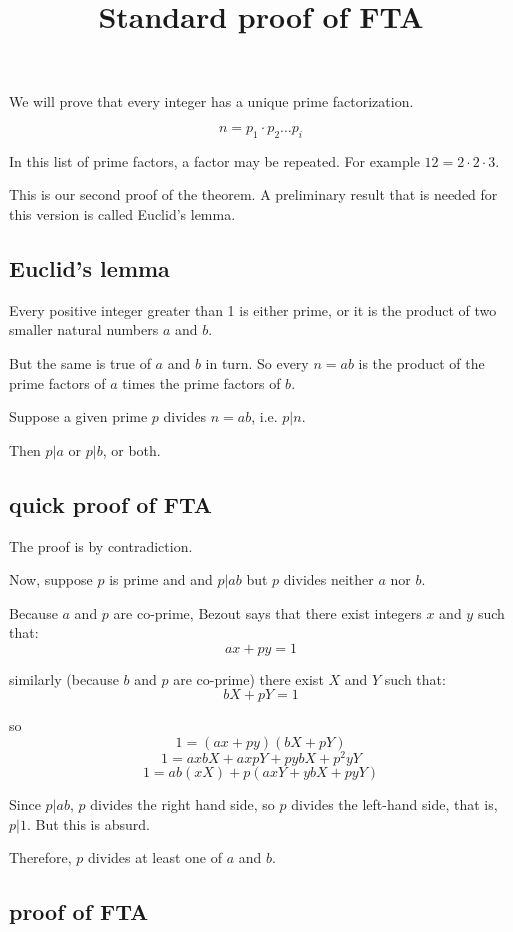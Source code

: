 \documentclass[11pt, oneside]{article}
\title{Standard proof of FTA}
\date{}
\begin{document}
\maketitle
\Large

We will prove that every integer has a unique prime factorization.

\[ n = p_1 \cdot p_2 \dots p_i \]

In this list of prime factors, a factor may be repeated.  For example $12 = 2 \cdot 2 \cdot 3$.

This is our second proof of the theorem.  A preliminary result that is needed for this version is called Euclid's lemma.

\subsection*{Euclid's lemma}

Every positive integer greater than 1 is either prime, or it is the product of two smaller natural numbers $a$ and $b$.

But the same is true of $a$ and $b$ in turn.  So every $n = ab$ is the product of the prime factors of $a$ times the prime factors of $b$.

Suppose a given prime $p$ divides $n=ab$, i.e. $p|n$.

Then $p|a$ or $p|b$, or both.

\subsection*{quick proof of FTA}

The proof is by contradiction.

Now, suppose $p$ is prime and and $p | ab$ but $p$ divides neither $a$ nor $b$.

Because $a$ and $p$ are co-prime, Bezout says that there exist integers $x$ and $y$ such that:
\[ ax + py = 1 \]

similarly (because $b$ and $p$ are co-prime) there exist $X$ and $Y$ such that:
\[ bX + pY = 1 \]
    
so
\[ 1 = (ax + py)(bX + pY) \]
\[ 1 = axbX + axpY + pybX + p^2yY \]
\[ 1 = ab(xX) + p(axY + ybX + pyY) \]
    
Since $p | ab$, $p$ divides the right hand side, so $p$ divides the left-hand side, that is, $p | 1$.  But this is absurd.  

Therefore,  $p$ divides at least one of $a$ and $b$.


\subsection*{proof of FTA}
\end{document}
